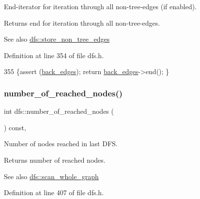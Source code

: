 End-\/iterator for iteration through all non-\/tree-\/edges (if enabled). 

\begin{DoxyReturn}{Returns}
end for iteration through all non-\/tree-\/edges. 
\end{DoxyReturn}
\begin{DoxySeeAlso}{See also}
\mbox{\hyperlink{classdfs_a6f54f1c4339eacc8961e795439d4593d}{dfs\+::store\+\_\+non\+\_\+tree\+\_\+edges}} 
\end{DoxySeeAlso}


Definition at line 354 of file dfs.\+h.


\begin{DoxyCode}
355     \{assert (\mbox{\hyperlink{classdfs_a1dc18a7df8d6b238d5301c92fc7540fa}{back\_edges}}); \textcolor{keywordflow}{return} \mbox{\hyperlink{classdfs_a1dc18a7df8d6b238d5301c92fc7540fa}{back\_edges}}->end(); \}
\end{DoxyCode}
\mbox{\label{classdfs_ae8849a552721ad4af5d9a81c6da35822}} 
\subsubsection{\texorpdfstring{number\+\_\+of\+\_\+reached\+\_\+nodes()}{number\_of\_reached\_nodes()}}
{\footnotesize\ttfamily int dfs\+::number\+\_\+of\+\_\+reached\+\_\+nodes (\begin{DoxyParamCaption}{ }\end{DoxyParamCaption}) const\hspace{0.3cm}{\ttfamily [inline]}, {\ttfamily [inherited]}}



Number of nodes reached in last D\+FS. 

\begin{DoxyReturn}{Returns}
number of reached nodes. 
\end{DoxyReturn}
\begin{DoxySeeAlso}{See also}
\mbox{\hyperlink{classdfs_aa7c864a6f3a120720138b187b3ed95b5}{dfs\+::scan\+\_\+whole\+\_\+graph}} 
\end{DoxySeeAlso}


Definition at line 407 of file dfs.\+h.


